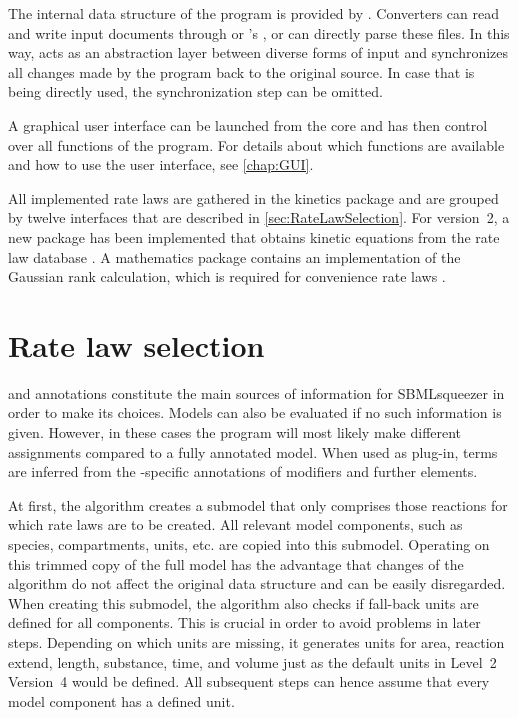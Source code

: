 The internal data structure of the program is provided by \JSBML \citep{Draeger2011b}.
Converters can read and write input \SBML documents through \libSBML \citep{Bornstein2008} or \CellDesigner's \API \citep{Funahashi2008}, or \JSBML can directly parse these files.
In this way, \JSBML acts as an abstraction layer between diverse forms of input and synchronizes all changes made by the program back to the original source.
In case that \JSBML is being directly used, the synchronization step can be omitted.

A graphical user interface can be launched from the core and has then control over all functions of the program.
For details about which functions are available and how to use the user interface, see \vref{chap:GUI}.

All implemented rate laws are gathered in the kinetics package and are grouped by twelve interfaces that are described in \vref{sec:RateLawSelection}.
For version~2, a new \SABIO package has been implemented that obtains kinetic equations from the rate law database \SABIO \citep{Wittig2012}.
A mathematics package contains an implementation of the Gaussian rank calculation, which is required for convenience rate laws \citep{Liebermeister2006}.

\section{Rate law selection}
\label{sec:RateLawSelection}

\MIRIAM \citep{Le2005, Laible2007, Juty2012, Juty2013} and \SBO annotations \citep{Courtot2011} constitute the main sources of information for SBMLsqueezer in order to make its choices.
Models can also be evaluated if no such information is given.
However, in these cases the program will most likely make different assignments compared to a fully annotated model.
When used as \CellDesigner plug-in, \SBO terms are inferred from the \CellDesigner-specific annotations of modifiers and further elements.

At first, the algorithm creates a submodel that only comprises those reactions for which rate laws are to be created.
All relevant model components, such as species, compartments, units, etc. are copied into this submodel.
Operating on this trimmed copy of the full model has the advantage that changes of the algorithm do not affect the original data structure and can be easily disregarded.
When creating this submodel, the algorithm also checks if fall-back units are defined for all components.
This is crucial in order to avoid problems in later steps.
Depending on which units are missing, it generates units for area, reaction extend, length, substance, time, and volume just as the default units in \SBML Level~2 Version~4 \citep{Hucka2008} would be defined.
All subsequent steps can hence assume that every model component has a defined unit.

